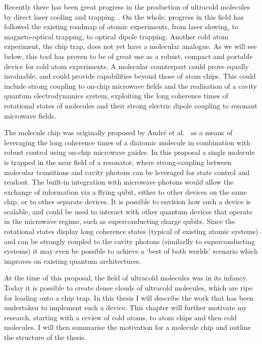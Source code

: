 
Recently there has been great progress in the production of ultracold molecules
by direct laser cooling and trapping~\cite{Fitch2021}. On the whole, progress
in this field has followed the existing roadmap of atomic experiments, from
laser slowing, to magneto-optical trapping, to optical dipole trapping.
Another cold atom experiment, the chip trap, does not yet have a molecular
analogue. As we will see below, this tool has proven to be of great use as a
robust, compact and portable device for cold atom experiments. A molecular
counterpart could prove equally invaluable, and could provide capabilities
beyond those of atom chips. This could include strong coupling to on-chip
microwave fields and  the realisation of a cavity quantum electrodynamics
system, exploiting the long coherence times of rotational states of molecules
and their strong electric dipole coupling to resonant microwave fields.

The molecule chip was originally proposed by Andr\'e et al.~\cite{Andre2006} as
a means of leveraging the long coherence times of a diatomic molecule in
combination with robust control using on-chip microwave guides. In this
proposal a single molecule is trapped in the near field of a resonator, where
strong-coupling between molecular transitions and cavity photons can be
leveraged for state control and readout. The built-in integration with
microwave photons would allow the exchange of information via a flying qubit,
either to other devices on the same chip, or to other separate devices.
%
It is possible to envision how such a device is scalable, and could be used to 
interact with other quantum devices that operate in the microwave regime, such
as superconducting charge qubits. Since the rotational states display long
coherence states (typical of existing atomic systems) and can be strongly
coupled to the cavity photons (similarlly to superconducting systems) it may
even be possible to achieve a `best of both worlds' scenario which improves on
existing quantum architectures.

At the time of this proposal, the field of ultracold molecules was in its
infancy. Today it is possible to create dense clouds of ultracold molecules,
which are ripe for loading onto a chip trap. In this thesis I will describe the
work that has been undertaken to implement such a device. This chapter will
further motivate my research, starting with a review of cold atoms, to atom
chips and then cold molecules. I will then summarise the motivation for a
molecule chip and outline the structure of the thesis.

